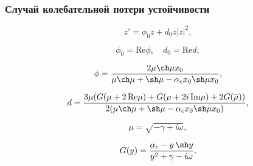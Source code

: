 \documentclass[fullscreen=true, unicode, bookmarks=false]{beamer}
\begin{document}
\begin{frame}
\frametitle{ Случай колебательной потери устойчивости }

\begin{equation}
	z' = \phi_0 z + d_0 z |z|^2,
\end{equation}

$$ \phi_0 = \mbox{Re} \phi, \quad d_0 = \mbox{Re} d, $$

\bigskip

$$ \phi = \frac{ 2 \mu \ch \mu x_0 }{ \mu \ch \mu +\sh \mu - \alpha_c x_0 \sh \mu x_0 }, $$

$$ d = \frac{ 3 \mu ( G(\mu + 2\,\mbox{Re}\mu) + G(\mu + 2i\,\mbox{Im}\mu) + 2G(\overline{\mu}) ) }{ 2 ( \mu \ch \mu +\sh \mu - \alpha_c x_0 \sh \mu x_0 ) }, $$

$$ \mu = \sqrt{-\gamma + i \omega}, $$

$$ G(y) = \frac{ \alpha_c - y\,\sh y }{ y^2 + \gamma - i\omega }. $$

\end{frame}
\end{document}
